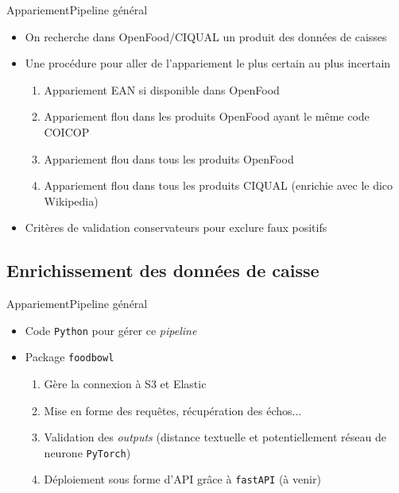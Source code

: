 \documentclass[ignorenonframetext,]{beamer}
\begin{document}
\begin{frame}{Appariement}{Pipeline général}

\begin{itemize}
    \item On recherche dans OpenFood/CIQUAL un produit des données de caisses
    \item Une procédure pour aller de l'appariement le plus certain
au plus incertain
\begin{enumerate}
    \item Appariement EAN si disponible dans OpenFood
    \item Appariement flou dans les produits OpenFood ayant le même code COICOP
    \item Appariement flou dans tous les produits OpenFood
    \item Appariement flou dans tous les produits CIQUAL (enrichie avec le dico Wikipedia)
\end{enumerate}
\item Critères de validation conservateurs pour exclure faux positifs
\end{itemize}

\end{frame}

\subsection{Enrichissement des données de caisse}

\begin{frame}{Appariement}{Pipeline général}

\begin{itemize}
    \item Code \texttt{Python} pour gérer ce \textit{pipeline}
    \item Package \texttt{foodbowl} %
\begin{enumerate}
    \item Gère la connexion à S3 et Elastic
    \item Mise en forme des requêtes, récupération des échos...
    \item Validation des \textit{outputs} (distance textuelle et potentiellement réseau de neurone \texttt{PyTorch})
    \item Déploiement sous forme d'API grâce à \texttt{fastAPI} (à venir)
\end{enumerate}
\end{itemize}

\end{frame}
\end{document}
